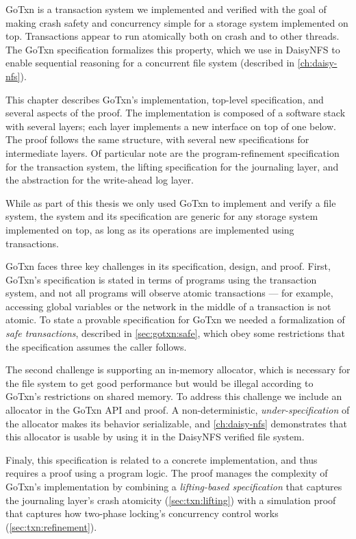 GoTxn is a transaction system we implemented and verified with the goal of
making crash safety and concurrency simple for a storage system implemented on
top. Transactions appear to run atomically both on crash and to other threads.
The GoTxn specification formalizes this property, which we use in DaisyNFS to
enable sequential reasoning for a concurrent file system (described in
\cref{ch:daisy-nfs}).

This chapter describes GoTxn's implementation, top-level specification, and
several aspects of the proof. The implementation is composed of a software stack
with several layers; each layer implements a new interface on top of one
below. The proof follows the same structure, with several new specifications for
intermediate layers. Of particular note are the
program-refinement specification for the transaction system, the lifting
specification for the journaling layer, and the abstraction for the write-ahead
log layer.

While as part of this thesis we only used GoTxn to implement and verify a file
system, the system and its specification are generic for any
storage system implemented on top, as long as its operations are implemented
using transactions.

GoTxn faces three key challenges in its specification, design, and proof.
First, GoTxn's specification is stated in terms of programs using the
transaction system, and not all programs will observe atomic transactions ---
for example, accessing global variables or the network in the middle of a
transaction is not atomic. To state a provable specification for GoTxn we needed
a formalization of \emph{safe transactions}, described in \cref{sec:gotxn:safe},
which obey some restrictions that the specification assumes the caller follows.

The second challenge is supporting an in-memory allocator, which is necessary
for the file system to get good performance but would be illegal according to
GoTxn's restrictions on shared memory. To address this challenge we include an
allocator in the GoTxn API and proof. A non-deterministic,
\emph{under-specification} of the allocator makes its behavior serializable, and
\cref{ch:daisy-nfs} demonstrates that this allocator is usable by using it in
the DaisyNFS verified file system.

Finaly, this specification is related to a concrete implementation, and thus
requires a proof using a program logic. The proof manages the complexity of
GoTxn's implementation by combining a \emph{lifting-based specification} that
captures the journaling layer's crash atomicity (\cref{sec:txn:lifting}) with a
simulation proof that captures how two-phase locking's concurrency control works
(\cref{sec:txn:refinement}).

